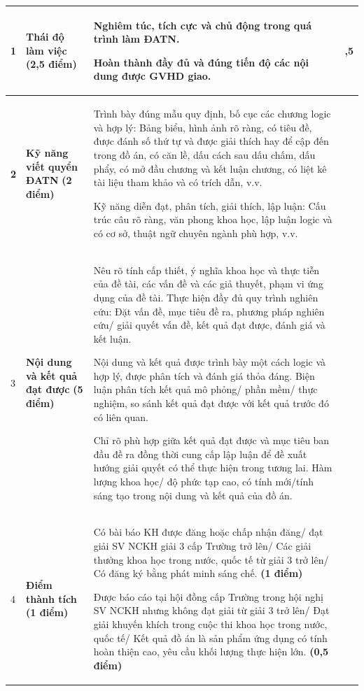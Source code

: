 {\begin{tabular}{|>{\centering\arraybackslash\bfseries}m{0.62cm}%
                  |>{\centering\arraybackslash}m{2.05cm}%
                  |m{12.55cm}%
                  |>{\centering\arraybackslash}m{1.3cm}|}
  1 &
  \textbf{Thái độ làm việc} \newline\textbf{(2,5 điểm)} &
  Nghiêm túc, tích cực và chủ động trong quá trình làm ĐATN.

  Hoàn thành đầy đủ và đúng tiến độ các nội dung được GVHD giao.
  & 2,5\\
  \hline

  2 &
  \textbf{Kỹ năng viết quyển ĐATN} \newline\textbf{(2 điểm)} &
  Trình bày đúng mẫu quy định, bố cục các chương logic và hợp lý: Bảng biểu, hình
  ảnh rõ ràng, có tiêu đề, được đánh số thứ tự và được giải thích hay để cập đến
  trong đồ án, có căn lề, dấu cách sau dấu chấm, dấu phẩy, có mở đầu chương và
  kết luận chương, có liệt kê tài liệu tham khảo và có trích dẫn, v.v.

  Kỹ năng diễn đạt, phân tích, giải thích, lập luận: Cấu trúc câu rõ ràng, văn
  phong khoa học, lập luận logic và có cơ sở, thuật ngữ chuyên ngành phù hợp, v.v.
  & 2\\
  \hline

  3 &
  \textbf{Nội dung và kết quả đạt được} \newline\textbf{(5 điểm)} &
  Nêu rõ tính cấp thiết, ý nghĩa khoa học và thực tiễn của đề tài, các vấn đề và
  các giả thuyết, phạm vi ứng dụng của đề tài. Thực hiện đầy đủ quy trình nghiên
  cứu: Đặt vấn đề, mục tiêu đề ra, phương pháp nghiên cứu/ giải quyết vấn đề, kết
  quả đạt được, đánh giá và kết luận.

  Nội dung và kết quả được trình bày một cách logic và hợp lý, được phân tích và
  đánh giá thỏa đáng. Biện luận phân tích kết quả mô phỏng/ phần mềm/ thực
  nghiệm, so sánh kết quả đạt được với kết quả trước đó có liên quan.

  Chỉ rõ phù hợp giữa kết quả đạt được và mục tiêu ban đầu đề ra đồng thời cung
  cấp lập luận để đề xuất hướng giải quyết có thể thực hiện trong tương lai. Hàm
  lượng khoa học/ độ phức tạp cao, có tính mới/tính sáng tạo trong nội dung và
  kết quả của đồ án.
  & 5\\
  \hline

  4 &
  \textbf{Điểm thành tích} \newline\textbf{(1 điểm)} &
  Có bài báo KH được đăng hoặc chấp nhận đăng/ đạt giải SV NCKH giải 3 cấp
  Trường trở lên/ Các giải thưởng khoa học trong nước, quốc tế từ giải 3 trở lên/
  Có đăng ký bằng phát minh sáng chế. \textbf{(1 điểm)}

  Được báo cáo tại hội đồng cấp Trường trong hội nghị SV NCKH nhưng không đạt
  giải từ giải 3 trở lên/ Đạt giải khuyến khích trong cuộc thi khoa học trong nước,
  quốc tế/ Kết quả đồ án là sản phẩm ứng dụng có tính hoàn thiện cao, yêu cầu
  khối lượng thực hiện lớn. \textbf{(0,5 điểm)}
  & 0\\
  \hline


\end{tabular}}
